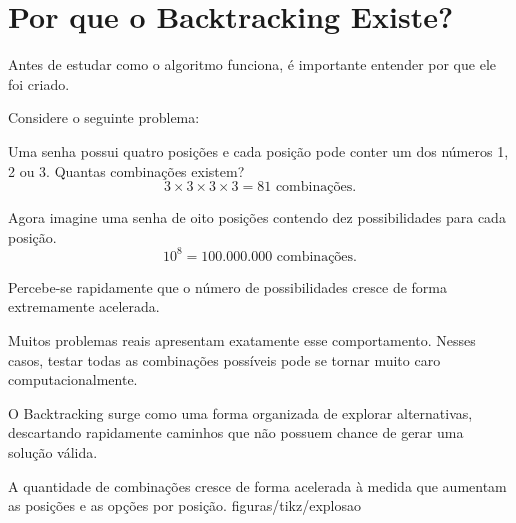 \section{Por que o Backtracking Existe?}

Antes de estudar como o algoritmo funciona, é importante entender por que ele foi criado.

Considere o seguinte problema:

Uma senha possui quatro posições e cada posição pode conter um dos números 1, 2 ou 3. Quantas combinações existem?
\[
  3 \times 3 \times 3 \times 3 = 81 \text{ combinações.}
\]

Agora imagine uma senha de oito posições contendo dez possibilidades para cada posição.
\[
  10^{8} = 100{.}000{.}000 \text{ combinações.}
\]

Percebe-se rapidamente que o número de possibilidades cresce de forma extremamente acelerada.

Muitos problemas reais apresentam exatamente esse comportamento. Nesses casos, testar todas as combinações possíveis pode se tornar muito caro computacionalmente.

O Backtracking surge como uma forma organizada de explorar alternativas, descartando rapidamente caminhos que não possuem chance de gerar uma solução válida.

%
  {A quantidade de combinações cresce de forma acelerada à medida que aumentam as posições e as opções por posição.}%
  {figuras/tikz/explosao}
